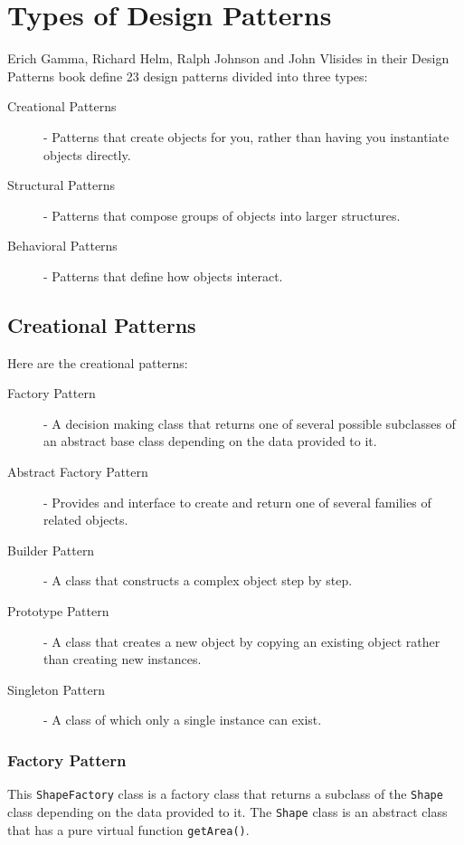 \documentclass[12pt letter]{report}
\begin{document}
\chapter{Types of Design Patterns}
Erich Gamma, Richard Helm, Ralph Johnson and John Vlisides in their Design Patterns book define 23 design patterns  divided into three types:

\begin{description}
  \item[Creational Patterns]  - Patterns that create objects for you, rather than having you instantiate objects directly.
  \item[Structural Patterns] - Patterns that compose groups of objects into larger structures.
  \item[Behavioral Patterns] - Patterns that define how objects interact.
\end{description}

\section{Creational Patterns}
Here are the creational patterns:
\begin{description}
  \item[Factory Pattern]  - A decision making class that returns one of several possible subclasses of an abstract base class depending on the data provided to it.
  \item[Abstract Factory Pattern] - Provides and interface to create and return one of several families of related objects.
  \item[Builder Pattern] - A class that constructs a complex object step by step.
  \item[Prototype Pattern] - A class that creates a new object by copying an existing object rather than creating new instances.
  \item[Singleton Pattern] - A class of which only a single instance can exist.
\end{description}

\subsection{Factory Pattern}


This \lstinline{ShapeFactory} class is a factory class that returns a subclass of the \lstinline{Shape} class depending on the data provided to it. The \lstinline{Shape} class is an abstract class that has a pure virtual function \lstinline{getArea()}.
\end{document}
